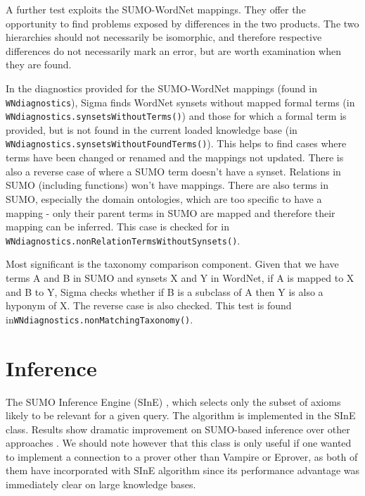 \documentclass{book}
\begin{document}
A further test exploits the SUMO-WordNet mappings. They offer the opportunity to
find problems exposed by differences in the two products.  The two hierarchies
should not necessarily be isomorphic, and therefore respective differences do
not necessarily mark an error, but are worth examination when they are found.

\begin{sloppypar}
In the diagnostics provided for the SUMO-WordNet mappings
(found in \texttt{WNdiagnostics}), Sigma finds
WordNet synsets without mapped formal terms (in
\texttt{WNdiagnostics.synsetsWithoutTerms()}) and those for which a formal term
is provided, but is not found in the current loaded knowledge base (in
\texttt{WNdiagnostics.synsetsWithoutFoundTerms()}). This helps to find cases
where terms have been changed or renamed and the mappings not updated. There is
also a reverse case of where a SUMO term doesn't have a synset. Relations in
SUMO (including functions) won't have mappings.  There are also terms in SUMO,
especially the domain ontologies, which are too specific to have a mapping -
only their parent terms in SUMO are mapped and therefore their mapping can be
inferred.  This case is checked for in
\texttt{WNdiagnostics.nonRelationTermsWithoutSynsets()}.
\end{sloppypar}

Most significant is the taxonomy comparison component. Given that we have terms
A and B in SUMO and synsets X and Y in WordNet, if A is mapped to X and B to Y,
Sigma checks whether if B is a subclass of A then Y is also a hyponym of X. The
reverse case is also checked.  This test is found
in\texttt{WNdiagnostics.nonMatchingTaxonomy()}.

\section{Inference}
\label{chap:KnowEngi:sec:Infe}

\begin{sloppypar}
The SUMO Inference Engine (SInE) \cite{DBLP:conf/cade/HoderV11},
which selects only the subset of axioms likely to be relevant for a given query.
The algorithm is implemented in the SInE class.  Results
show dramatic improvement on SUMO-based inference over other approaches
\cite{ps07}. We should note however that this class is only useful if one wanted
to implement a connection to a prover other than Vampire or Eprover, as both of
them have incorporated with SInE algorithm since its performance advantage was
immediately clear on large knowledge bases.
\end{sloppypar}
\end{document}
